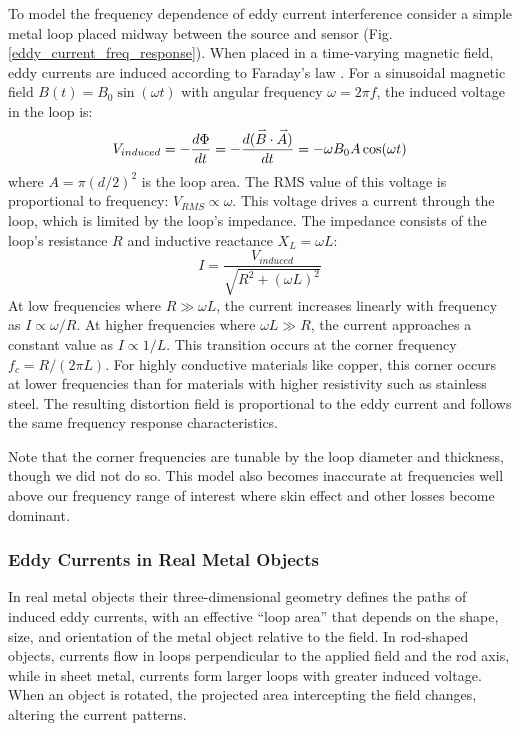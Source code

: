 \documentclass[journal,twoside,web]{ieeecolor}
\begin{document}
To model the frequency dependence of eddy current interference consider a simple metal loop placed midway between the source and sensor (Fig. \ref{eddy_current_freq_response}). When placed in a time-varying magnetic field, eddy currents are induced according to Faraday's law \cite{griffiths_introduction_1999}. For a sinusoidal magnetic field $B(t) = B_0 \sin(\omega t)$ with angular frequency $\omega = 2\pi f$, the induced voltage in the loop is:
\begin{equation}
V_{induced} = -\frac{d\Phi}{dt} = -\frac{d(\accentset{\rightharpoonup}{B} \cdot \accentset{\rightharpoonup}{A})}{dt} = -\omega B_0 A \cos(\omega t)
\label{eq:induced_voltage}
\end{equation}
\noindent where $A = \pi (d/2)^2$ is the loop area. The RMS value of this voltage is proportional to frequency: $V_{RMS} \propto \omega$. This voltage drives a current through the loop, which is limited by the loop's impedance. The impedance consists of the loop's resistance $R$ and inductive reactance $X_L = \omega L$:
\begin{equation}
I = \frac{V_{induced}}{\sqrt{R^2 + (\omega L)^2}}
\label{eq:loop_current}
\end{equation}
At low frequencies where $R \gg \omega L$, the current increases linearly with frequency as $I \propto \omega/R$. At higher frequencies where $\omega L \gg R$, the current approaches a constant value as $I \propto 1/L$. This transition occurs at the corner frequency $f_c = R/(2\pi L)$. For highly conductive materials like copper, this corner occurs at lower frequencies than for materials with higher resistivity such as stainless steel. The resulting distortion field is proportional to the eddy current and follows the same frequency response characteristics.

Note that the corner frequencies are tunable by the loop diameter and thickness, though we did not do so. This model also becomes inaccurate at frequencies well above our frequency range of interest where skin effect and other losses become dominant.

\subsubsection{Eddy Currents in Real Metal Objects}
In real metal objects their three-dimensional geometry defines the paths of induced eddy currents, with an effective ``loop area'' that depends  on the shape, size, and orientation of the metal object relative to the field. In rod-shaped objects, currents flow in loops perpendicular to the applied field and the rod axis, while in sheet metal, currents form larger loops with greater induced voltage. When an object is rotated, the projected area intercepting the field changes, altering the current patterns.
\end{document}
